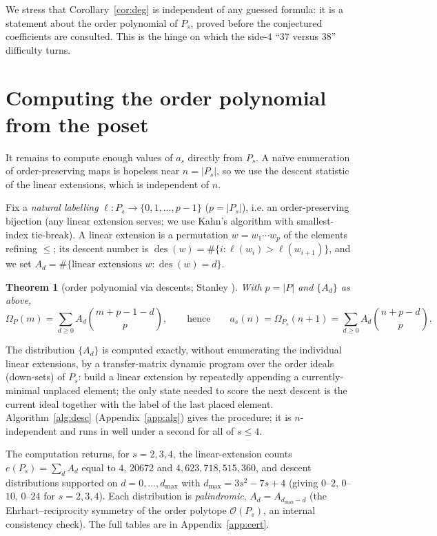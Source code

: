 \documentclass[11pt]{article}
\theoremstyle{plain}
\newtheorem{theorem}{Theorem}
\theoremstyle{definition}
\theoremstyle{remark}
\newcommand{\Om}{\Omega}
\newcommand{\des}{\operatorname{des}}
\newenvironment{callout}
  {\par\smallskip\noindent\begin{center}\begin{minipage}{0.95\linewidth}%
   \color{periapsisInk}\small\itshape\rule{0pt}{1ex}}
  {\end{minipage}\end{center}\smallskip}
\begin{document}
We stress that Corollary~\ref{cor:deg} is independent of any guessed formula: it is a statement
about the order polynomial of $P_s$, proved before the conjectured coefficients are consulted. This
is the hinge on which the side-$4$ ``$37$ versus $38$'' difficulty turns.

\section{Computing the order polynomial from the poset}\label{sec:compute}

It remains to compute enough values of $a_s$ directly from $P_s$. A na\"ive enumeration of
order-preserving maps is hopeless near $n=\lvert P_s\rvert$, so we use the descent statistic of the
linear extensions, which is independent of $n$.

Fix a \emph{natural labelling} $\ell:P_s\to\{0,1,\dots,p-1\}$ ($p=\lvert P_s\rvert$), i.e. an
order-preserving bijection (any linear extension serves; we use Kahn's algorithm with smallest-index
tie-break). A linear extension is a permutation $w=w_1\cdots w_p$ of the elements refining $\le$;
its descent number is $\des(w)=\#\{i:\ell(w_i)>\ell(w_{i+1})\}$, and we set
$A_d=\#\{\text{linear extensions } w:\des(w)=d\}$.

\begin{theorem}[order polynomial via descents; Stanley {\cite[Thm.~3.15.8]{EC1}}]\label{thm:descent}
With $p=\lvert P\rvert$ and $\{A_d\}$ as above,
\[
  \Om_P(m)=\sum_{d\ge 0} A_d\binom{m+p-1-d}{p},
  \qquad\text{hence}\qquad
  a_s(n)=\Om_{P_s}(n+1)=\sum_{d\ge 0} A_d\binom{n+p-d}{p}.
\]
\end{theorem}

The distribution $\{A_d\}$ is computed exactly, without enumerating the individual linear extensions,
by a transfer-matrix dynamic program over the order ideals (down-sets) of $P_s$: build a linear
extension by repeatedly appending a currently-minimal unplaced element; the only state needed to
score the next descent is the current ideal together with the label of the last placed element.
Algorithm~\ref{alg:desc} (Appendix~\ref{app:alg}) gives the procedure; it is $n$-independent and runs
in well under a second for all of $s\le 4$.

\begin{callout}
\upshape
The computation returns, for $s=2,3,4$, the linear-extension counts $e(P_s)=\sum_d A_d$ equal to
$4$, $20672$ and $4{,}623{,}718{,}515{,}360$, and descent distributions supported on
$d=0,\dots,d_{\max}$ with $d_{\max}=3s^2-7s+4$ (giving $0$--$2$, $0$--$10$, $0$--$24$ for $s=2,3,4$).
Each distribution is
\emph{palindromic}, $A_d=A_{d_{\max}-d}$ (the Ehrhart--reciprocity symmetry of the order polytope
$\mathcal O(P_s)$, an internal consistency check). The full tables are in Appendix~\ref{app:cert}.
\end{callout}
\end{document}
